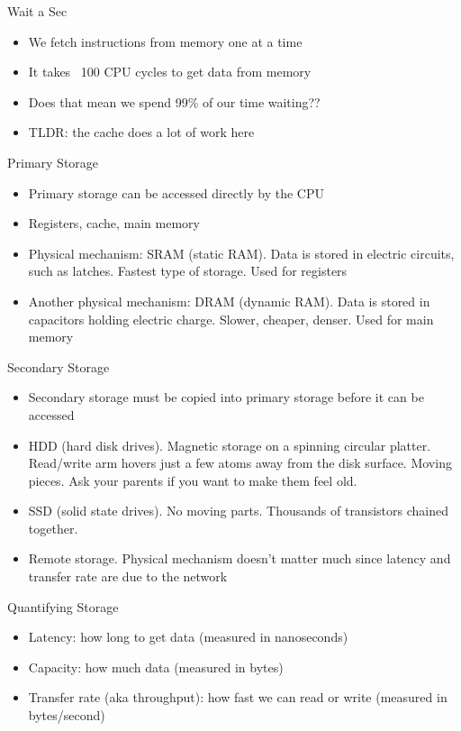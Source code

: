\begin{frame}{Wait a Sec}
	\begin{itemize}
		\item We fetch instructions from memory one at a time
		\item It takes ~100 CPU cycles to get data from memory
		\item Does that mean we spend 99\% of our time waiting??
		\item TLDR: the cache does a lot of work here
	\end{itemize}
\end{frame}


\begin{frame}{Primary Storage}
	\begin{itemize}
		\item Primary storage can be accessed directly by the CPU
		\item Registers, cache, main memory
		\item Physical mechanism: SRAM (static RAM). Data is stored in electric circuits, such as latches. Fastest type of storage. Used for registers
		\item Another physical mechanism: DRAM (dynamic RAM). Data is stored in capacitors holding electric charge. Slower, cheaper, denser. Used for main memory
	\end{itemize}
\end{frame}

\begin{frame}{Secondary Storage}
	\begin{itemize}
		\item Secondary storage must be copied into primary storage before it can be accessed
		\item HDD (hard disk drives). Magnetic storage on a spinning circular platter. Read/write arm hovers just a few atoms away from the disk surface. Moving pieces. Ask your parents if you want to make them feel old.
		\item SSD (solid state drives). No moving parts. Thousands of transistors chained together.
		\item Remote storage. Physical mechanism doesn't matter much since latency and transfer rate are due to the network
	\end{itemize}
\end{frame}

\begin{frame}{Quantifying Storage}
	\begin{itemize}
		\item Latency: how long to get data (measured in nanoseconds)
		\item Capacity: how much data (measured in bytes)
		\item Transfer rate (aka throughput): how fast we can read or write (measured in bytes/second)
	\end{itemize}
\end{frame}

